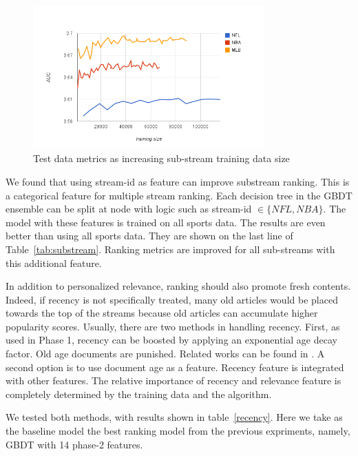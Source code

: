 \begin{figure}
\caption{Test data metrics as increasing sub-stream training data size}\label{fig:curve}
\centering
\includegraphics[width=3.5in]{training-curve.png}

\end{figure}

We found that using stream-id as feature can improve substream ranking. This 
is a categorical feature for multiple stream ranking. Each decision tree in 
the GBDT ensemble can be split at node with logic such as stream-id $\in 
\{NFL,NBA\}$.  The model with these features is trained on all sports data.  
The results are even better than using all sports data. They are shown on the 
last line of  Table~\ref{tab:substream}. Ranking metrics are improved for all 
sub-streams with this additional feature.
 




  
 In addition to personalized relevance, ranking should also promote fresh 
 contents.  Indeed, if recency is not specifically treated,  many old articles 
 would be placed towards the top of the streams because old articles can 
 accumulate 
 higher popularity scores.   Usually, there are two methods 
 in handling recency. First, as used in Phase 1, recency can be boosted by 
 applying an exponential age decay factor. Old age documents are punished.  
 Related works can be found in 
 \cite{Li:2003:TLM:956863.956951,Metzler:2009:ISR:1571941.1572085}. A second 
 option is to use document age as a feature. Recency feature is integrated 
 with other features. The relative importance of recency and relevance feature 
 is 
 completely determined by the training data and the algorithm. 
 
 We tested both methods, with results shown in table~\ref{recency}. Here we 
 take as 
 the baseline model the best ranking model from the previous expriments, 
 namely, GBDT with 14 phase-2 features.

